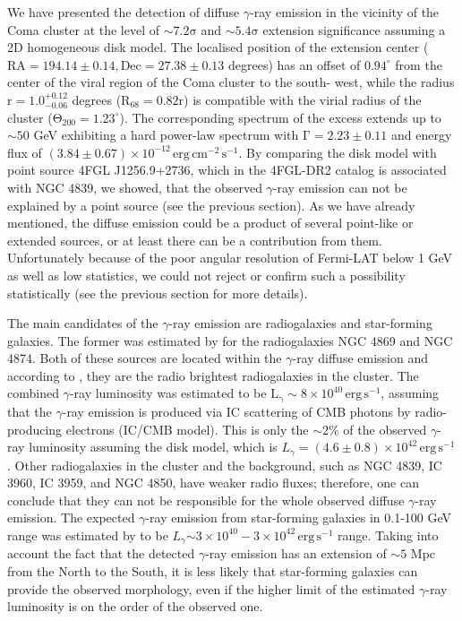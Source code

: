 \documentclass[fleqn,usenatbib]{mnras}
\begin{document}
We have presented the detection of diffuse $\gamma$-ray emission in the vicinity of the Coma cluster at the level of $\mathrm{\sim7.2\sigma}$ and $\mathrm{\sim5.4\sigma}$ extension significance assuming a 2D homogeneous disk model. The localised position of the extension center ($\mathrm{RA=194.14\pm0.14, Dec=27.38\pm0.13}$ degrees) has an offset of $\mathrm{0.94^{\circ}}$ from the center of the viral region of the Coma cluster to the south-
west, while the radius $\mathrm{r=1.0^{+0.12}_{-0.06}}$ degrees ($\mathrm{R_{68}=0.82r}$) is compatible with the virial radius  of the cluster ($\mathrm{\Theta_{200}=1.23^{\circ}}$). The corresponding spectrum of the excess extends up to $\sim50$ GeV exhibiting a hard power-law spectrum with $\mathrm{\Gamma=2.23\pm0.11}$ and energy flux of $\mathrm{(3.84\pm0.67)\times10^{-12}\,erg\,cm^{-2}\,s^{-1}}$.  By comparing the disk model with point source 4FGL J1256.9+2736, which in the 4FGL-DR2 catalog is associated with NGC 4839, we showed, that the observed $\gamma$-ray emission can not be explained by a point source (see the previous section). As we have already mentioned, the diffuse emission could be a product of several point-like or extended sources, or at least there can be a contribution from them. Unfortunately because of the poor angular resolution of Fermi-LAT below 1 GeV as well as low statistics, we could not reject or confirm such a possibility statistically (see the previous section for more details). 

The main candidates of the $\gamma$-ray emission are radiogalaxies and star-forming galaxies. The former was estimated by \citet{comaFermiCollab2016ApJ...819..149A} for the radiogalaxies NGC 4869 and NGC 4874. Both of these sources are located within the $\gamma$-ray diffuse emission and according to \citet{1985MNRAS.215..437C}, they are the radio brightest radiogalaxies in the cluster. The combined $\gamma$-ray luminosity was estimated to be $\mathrm{L_{\gamma}\sim8\times10^{40}\,erg\,s^{-1}}$, assuming that the $\gamma$-ray emission is produced via IC scattering of CMB photons by radio-producing electrons (IC/CMB model). This is only the $\mathrm{\sim2\%}$ of the observed $\gamma$-ray luminosity assuming the disk model, which is $L_{\gamma}=(4.6\pm0.8)\times10^{42}\, \mathrm{erg \,s^{-1}}$. Other radiogalaxies in the cluster and the background, such as NGC 4839, IC 3960, IC 3959, and NGC 4850, have weaker radio fluxes; therefore, one can conclude that they can not be responsible for the whole observed diffuse $\gamma$-ray emission. The expected $\gamma$-ray emission from star-forming galaxies in 0.1-100 GeV range was estimated by \citet{2012ApJ...755..117S} to be $L_{\gamma}\mathrm{\sim3\times10^{40}}-\mathrm{3\times10^{42} \,erg\, s^{-1}}$ range. Taking into account the fact that the detected $\gamma$-ray emission has an extension of $\mathrm{\sim5}$ Mpc from the North
to the South, it is less likely that star-forming galaxies can provide the observed morphology, even if the higher limit of the estimated $\gamma$-ray luminosity is on the order of the observed one. 
\end{document}
